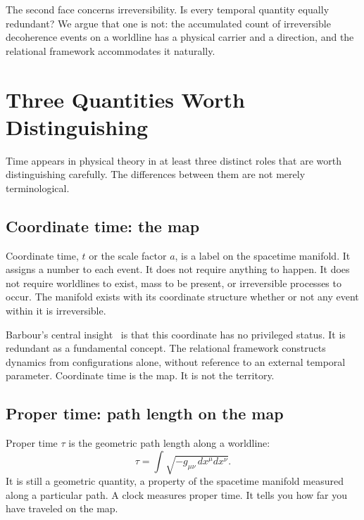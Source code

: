 \documentclass[12pt,a4paper]{article}
\begin{document}
The second face concerns irreversibility. Is every temporal quantity equally
redundant? We argue that one is not: the accumulated count of irreversible
decoherence events on a worldline has a physical carrier and a direction, and the
relational framework accommodates it naturally.

\section{Three Quantities Worth Distinguishing}
\label{sec:threequantities}

Time appears in physical theory in at least three distinct roles that
are worth distinguishing carefully. The differences between them are
not merely terminological.

\subsection{Coordinate time: the map}

Coordinate time, $t$ or the scale factor $a$, is a label on the
spacetime manifold. It assigns a number to each event. It does not require
anything to happen. It does not require worldlines to exist, mass to be
present, or irreversible processes to occur. The manifold exists with its
coordinate structure whether or not any event within it is irreversible.

Barbour's central insight~\citep{BarbourBertotti1982,Barbour1994} is that
this coordinate has no privileged status. It is redundant as a fundamental
concept. The relational framework constructs dynamics from configurations
alone, without reference to an external temporal parameter.
Coordinate time is the map. It is not the territory.

\subsection{Proper time: path length on the map}

Proper time $\tau$ is the geometric path length along a worldline:
\begin{equation}
\tau = \int \sqrt{-g_{\mu\nu}\,dx^\mu dx^\nu}.
\end{equation}
It is still a geometric quantity, a property of the spacetime manifold
measured along a particular path. A clock measures proper time. It tells
you how far you have traveled on the map.
\end{document}
